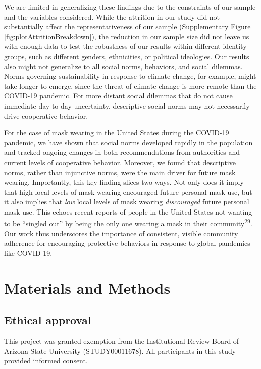 \documentclass[
  man, donotrepeattitle,floatsintext]{apa6}
\begin{document}
We are limited in generalizing these findings due to the constraints of our sample and the variables considered. While the attrition in our study did not substantially affect the representativeness of our sample (Supplementary Figure \ref{fig:plotAttritionBreakdown}),
the reduction in our sample size did not leave us with enough data to test the robustness of our results within different identity groups, such as different genders, ethnicities, or political ideologies. Our results also might not generalize to all social norms, behaviors, and social dilemmas. Norms governing sustainability in response to climate change, for example, might take longer to emerge, since the threat of climate change is more remote than the COVID-19 pandemic. For more distant social dilemmas that do not cause immediate day-to-day uncertainty, descriptive social norms may not necessarily drive cooperative behavior.

For the case of mask wearing in the United States during the COVID-19 pandemic, we have shown that social norms developed rapidly in the population and tracked ongoing changes in both recommendations from authorities and current levels of cooperative behavior. Moreover, we found that descriptive norms, rather than injunctive norms, were the main driver for future mask wearing. Importantly, this key finding slices two ways. Not only does it imply that high local levels of mask wearing encouraged future personal mask use, but it also implies that \emph{low} local levels of mask wearing \emph{discouraged} future personal mask use. This echoes recent reports of people in the United States not wanting to be ``singled out'' by being the only one wearing a mask in their community\textsuperscript{29}. Our work thus underscores the importance of consistent, visible community adherence for encouraging protective behaviors in response to global pandemics like COVID-19.

\hypertarget{materials-and-methods}{%
\section{Materials and Methods}\label{materials-and-methods}}

\hypertarget{ethical-approval}{%
\subsection{Ethical approval}\label{ethical-approval}}

This project was granted exemption from the Institutional Review Board of Arizona State University (STUDY00011678). All participants in this study provided informed consent.
\end{document}
